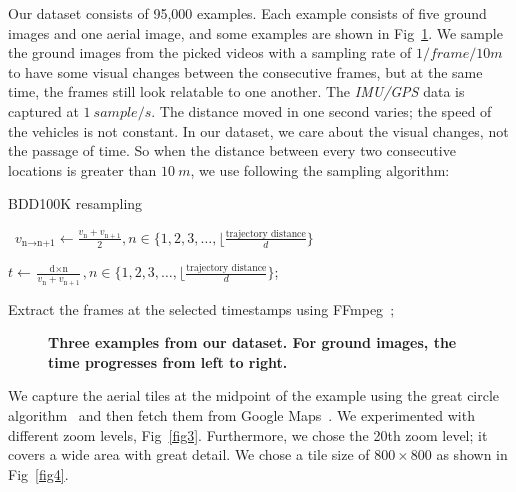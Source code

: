\documentclass[10pt,letterpaper]{article}
\begin{document}
Our dataset consists of 95,000 examples. Each example consists of five ground images and one aerial image, and some examples are shown in Fig~\ref{fig2}. We sample the ground images from the picked videos with a sampling rate of $1 / frame/10 m$ to have some visual changes between the consecutive frames, but at the same time, the frames still look relatable to one another. The \emph{IMU/GPS} data is captured at $1 \ sample/s$. The distance moved in one second varies; the speed of the vehicles is not constant. In our dataset, we care about the visual changes, not the passage of time. So when the distance between every two consecutive locations is greater than $10 \ m$,  we use following the sampling algorithm:

\begin{algorithm}[!h]
\caption{BDD100K resampling}
\
$v_{\text{n} \to \text{n+1}} \gets \frac{v_{\text{n}} + v_{\text{n} + 1}}{2}, n \in \{1, 2, 3, \text{\ldots}, \lfloor\frac{\text{trajectory distance}}{d} \}$ \;

\Comment{To get the timestamp of the nth frame ($t_{\text{n}}$)}

$t \gets \frac{\text{d} \times  \text{n}}{v_{\text{n}} + v_{\text{n} + 1}} , n \in \{1, 2, 3, \text{\ldots}, \lfloor\frac{\text{trajectory distance}}{d} \} $;\

Extract the frames at the selected timestamps using FFmpeg~\cite{bib23};\
\end{algorithm}

\begin{figure}[!h]
  \caption{{\bf Three examples from our dataset. For ground images, the time progresses from left to right.}}
  \label{fig2}
\end{figure}

We capture the aerial tiles at the midpoint of the example using the great circle algorithm~\cite{bib16} and then fetch them from Google Maps~\cite{bib15}. We experimented with different zoom levels, Fig~\ref{fig3}. Furthermore, we chose the 20th zoom level; it covers a wide area with great detail. We chose a tile size of  $800 \times 800$ as shown in Fig~\ref{fig4}.
\end{document}
